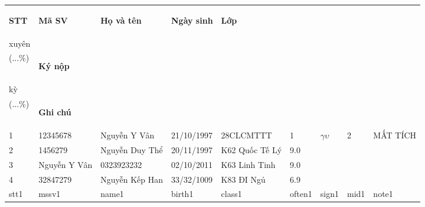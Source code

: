 \documentclass[14pt,a4paper]{article}
\begin{document}
\begin{tabular}{ m{0.7cm} | m{2cm}| m{4cm} | m{2cm} | m{2.5cm} | m{1.2cm} | m{1.5cm} | m{1cm} | m{1.6cm} | }
		\toprule[0.4mm]
		\begin{center}\textbf{STT }\end{center}&\begin{center}\textbf{Mã SV}\end{center} &\begin{center}\textbf{Họ và tên}\end{center} &\begin{center} \textbf{Ngày sinh}\end{center} &\begin{center} \textbf{Lớp}\end{center} &\vspace{-0.2cm}\begin{center} \textbf{Thường\vspace{-0.2cm}\\xuyên\vspace{-0.2cm}\\(...\%)\vspace{-0.6cm} }\end{center} & \begin{center} \textbf{Ký nộp }\end{center}&\vspace{-0.2cm}\begin{center} \textbf{Giữa\vspace{-0.2cm}\\kỳ\vspace{-0.2cm}\\(...\%)\vspace{-0.6cm} }\end{center} &\begin{center} \textbf{Ghi chú}\vspace{-0cm}\end{center}\\
		\hline
		1 & 12345678 & Nguyễn Y Vân & 21/10/1997 & 28CLCMTTT & 1 & $ \gamma\upsilon $ & 2 & MẤT TÍCH\\
		\hline
		2 & 1456279 & Nguyễn Duy Thể & 20/11/1997 & K62 Quốc Tế Lý & 9.0 & & & \\
		\hline
		3 & Nguyễn Y Vân & 0323923232 & 02/10/2011 & K63 Linh Tinh & 9.0 & & & \\
		\hline
		4 & 32847279 & Nguyễn Kếp Han & 33/32/1009 & K83 ĐI Ngủ & 6.9 & & & \\
		\hline
		stt1 & mssv1 & name1 & birth1 & class1 & often1 & sign1 & mid1 & note1\\

\end{tabular}
\end{document}
